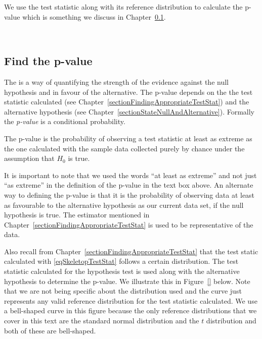 We use the test statistic along with its reference distribution to calculate 
the p-value which is something we discuss in Chapter~\ref{sectionFindingPValue}.


\hfill\\

\subsection{Find the p-value}
\label{sectionFindingPValue}

The  is a way of quantifying the strength of the evidence against the null hypothesis and in favour of the alternative. 
The p-value depends on the the test statistic calculated (see Chapter~\ref{sectionFindingAppropriateTestStat})
and the alternative hypothesis (see Chapter~\ref{sectionStateNullAndAlternative}).
Formally the \emph{p-value} is a conditional probability.

\begin{termBox}{
The p-value 
is the probability of observing a test statistic at least as extreme as the one calculated with the sample data
collected purely by chance under the assumption that $H_0$ is true. 
}
\end{termBox}

It is important to note that we used the words ``at least as extreme'' and not just ``as extreme'' in the 
definition of the p-value in the text box above.
An alternate way to defining the p-value is that it is the probability of observing data at least as favourable to the alternative hypothesis as our current data set, if the null hypothesis is true. 
The estimator mentioned in Chapter~\ref{sectionFindingAppropriateTestStat} is 
used to be representative of the data.

Also recall from Chapter~\ref{sectionFindingAppropriateTestStat} that the test static calculated with
\ref{eqSkeletopTestStat} follows a certain distribution.
The test statistic calculated for the hypothesis test is used along with the alternative hypothesis
to determine the p-value.
We illustrate this in Figure~\ref{} below.
Note that we are not being specific about the distribution used and the curve just represents
any valid reference distribution for the test statistic calculated. 
We use a bell-shaped curve in this figure because the only reference distributions that 
we cover in this text are the standard normal distribution and the $t$ distribution and both
of these are bell-shaped.

